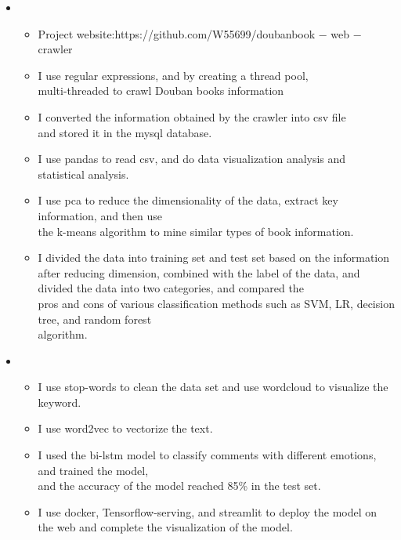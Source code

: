 \begin{itemize}[leftmargin=*]
    \newpage
    \item
      {\small
      \begin{itemize}
       \item Project website:https://github.com/W55699/doubanbook − web − crawler
       \item I use regular expressions, and by creating a thread pool,\\ multi-threaded to crawl Douban books information
       \item I converted the information obtained by the crawler into csv file\\ and stored it in the mysql database.
       \item I use pandas to read csv, and do data visualization analysis and statistical analysis.
       \item I use pca to reduce the dimensionality of the data, extract key information, and then use\\ the k-means algorithm to mine similar types of book information.
       \item I divided the data into training set and test set based on the information after reducing dimension, combined with the label of the data, and divided the data into two categories, and compared the\\ pros and cons of various classification methods such as SVM, LR, decision tree, and random forest\\ algorithm.
      \end{itemize}
      }
    \item
      {\small
      \begin{itemize}
      
       \item I use stop-words to clean the data set and use wordcloud to visualize the keyword. 	
       \item I use word2vec to vectorize the text.
       \item I used the bi-lstm model to classify comments with different emotions, and trained the model, \\and the accuracy of the model reached 85\% in the test set. 
       \item I use docker, Tensorflow-serving, and streamlit to deploy the model on the web and complete the visualization of the model.
      \end{itemize}
      }
     \end{itemize}
